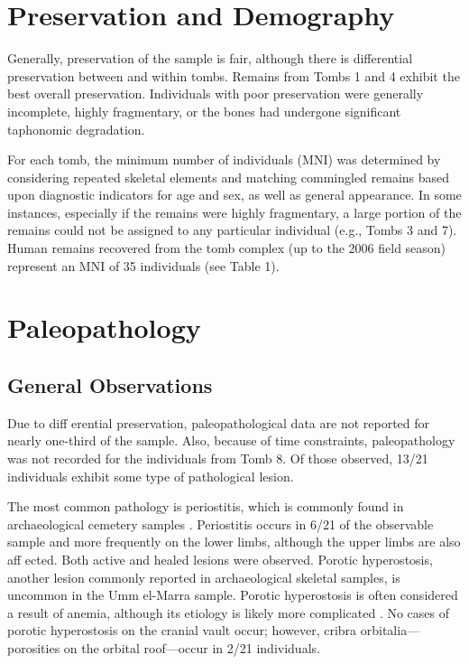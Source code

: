 \documentclass[]{book}
\begin{document}
\section{Preservation and Demography}\label{preservation-and-demography}

Generally, preservation of the sample is fair, although there is
differential preservation between and within tombs. Remains from Tombs 1
and 4 exhibit the best overall preservation. Individuals with poor
preservation were generally incomplete, highly fragmentary, or the bones
had undergone significant taphonomic degradation.

For each tomb, the minimum number of individuals (MNI) was determined by
considering repeated skeletal elements and matching commingled remains
based upon diagnostic indicators for age and sex, as well as general
appearance. In some instances, especially if the remains were highly
fragmentary, a large portion of the remains could not be assigned to any
particular individual (e.g., Tombs 3 and 7). Human remains recovered
from the tomb complex (up to the 2006 field season) represent an MNI of
35 individuals (see Table 1).

\section{Paleopathology}\label{paleopathology}

\subsection{General Observations}\label{general-observations}

Due to diff erential preservation, paleopathological data are not
reported for nearly one-third of the sample. Also, because of time
constraints, paleopathology was not recorded for the individuals from
Tomb 8. Of those observed, 13/21 individuals exhibit some type of
pathological lesion.

The most common pathology is periostitis, which is commonly found in
archaeological cemetery samples \citep{ortner2003identification}.
Periostitis occurs in 6/21 of the observable sample and more frequently
on the lower limbs, although the upper limbs are also aff ected. Both
active and healed lesions were observed. Porotic hyperostosis, another
lesion commonly reported in archaeological skeletal samples, is uncommon
in the Umm el-Marra sample. Porotic hyperostosis is often considered a
result of anemia, although its etiology is likely more complicated
\citep{walker2009causes}. No cases of porotic hyperostosis on the
cranial vault occur; however, cribra orbitalia---porosities on the
orbital roof---occur in 2/21 individuals.
\end{document}
